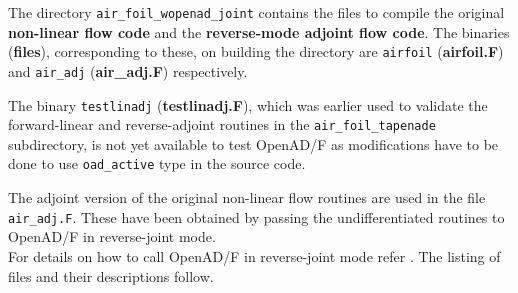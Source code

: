 \noindent The directory \texttt{air\_foil\_wopenad\_joint} contains the files to compile the original \textbf{non-linear flow code} and the \textbf{reverse-mode adjoint flow code}. The binaries (\textbf{files}), corresponding to these, on building the directory are \texttt{airfoil} (\textbf{{airfoil.F}}) and \texttt{air\_adj} (\textbf{{air\_adj.F}}) respectively. \\

\begin{TodoPar}\noindent The binary \texttt{testlinadj} (\textbf{{testlinadj.F}}), which was earlier used to validate the forward-linear and reverse-adjoint routines in the \texttt{air\_foil\_tapenade} subdirectory, is not yet available to test OpenAD/F as modifications have to be done to use \texttt{oad\_active} type in the source code.\end{TodoPar}

\noindent The adjoint version of the original non-linear flow routines are used in the file  \texttt{air\_adj.F}. These have been obtained by passing the undifferentiated routines to OpenAD/F in reverse-joint mode.\\

\noindent For details on how to call OpenAD/F in reverse-joint mode refer \cite{Utke_2014}. The listing of files and their descriptions follow.\\

